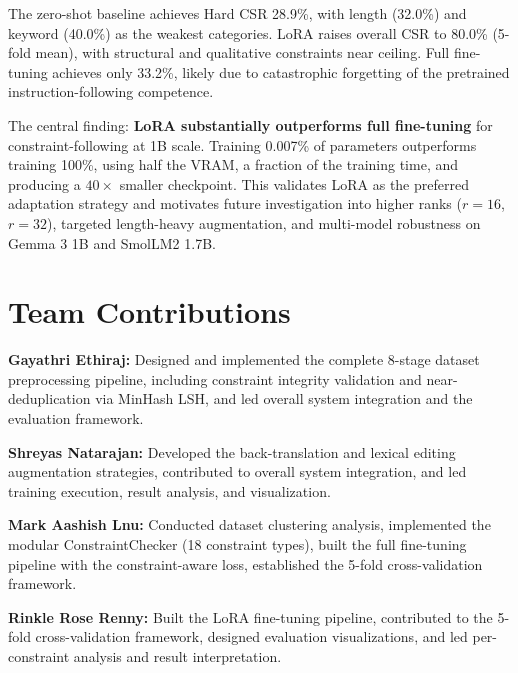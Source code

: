 \documentclass[10pt]{article}
\begin{document}
The zero-shot baseline achieves Hard CSR 28.9\%, with length (32.0\%) and
keyword (40.0\%) as the weakest categories. LoRA raises overall CSR to
80.0\% (5-fold mean), with structural and qualitative constraints near
ceiling. Full fine-tuning achieves only 33.2\%, likely due to catastrophic
forgetting of the pretrained instruction-following competence.

The central finding: \textbf{LoRA substantially outperforms full
fine-tuning} for constraint-following at 1B scale. Training 0.007\% of
parameters outperforms training 100\%, using half the VRAM, a fraction of
the training time, and producing a $40{\times}$ smaller checkpoint. This
validates LoRA as the preferred adaptation strategy and motivates future
investigation into higher ranks ($r{=}16$, $r{=}32$), targeted
length-heavy augmentation, and multi-model robustness on Gemma 3 1B and
SmolLM2 1.7B.

\section*{Team Contributions}

\textbf{Gayathri Ethiraj:} Designed and implemented the complete 8-stage dataset preprocessing pipeline, including constraint integrity validation and near-deduplication via MinHash LSH, and led overall system integration and the evaluation framework.

\textbf{Shreyas Natarajan:} Developed the back-translation and lexical editing augmentation strategies, contributed to overall system integration, and led training execution, result analysis, and visualization.

\textbf{Mark Aashish Lnu:}  Conducted dataset clustering analysis, implemented the modular ConstraintChecker (18 constraint types), built the full fine-tuning pipeline with the constraint-aware loss, established the 5-fold cross-validation framework.

\textbf{Rinkle Rose Renny:} Built the LoRA fine-tuning pipeline, contributed to the 5-fold cross-validation framework, designed evaluation visualizations, and led per-constraint analysis and result interpretation.
\end{document}
